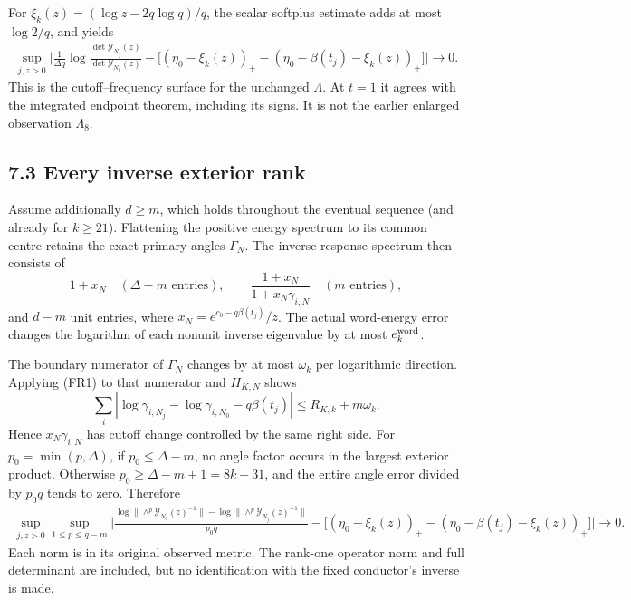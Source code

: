 \documentclass[10pt]{article}
\begin{document}
For \(\xi_k(z)=(\log z-2q\log q)/q\), the scalar softplus estimate adds at most \(\log2/q\), and yields \[
 \boxed{\begin{split}
 \sup_{j,z>0}\bigg|
 \frac1{\Delta q}\log\frac{\det\mathscr Y_{N_j}(z)}
 {\det\mathscr Y_{N_0}(z)}
 -\big[(\eta_0-\xi_k(z))_+
 -(\eta_0-\beta(t_j)-\xi_k(z))_+\big]
 \bigg|\longrightarrow0.
 \end{split}}
 \tag{FR5}
\] This is the cutoff--frequency surface for the unchanged \(\Lambda\). At \(t=1\) it agrees with the integrated endpoint theorem, including its signs. It is not the earlier enlarged observation \(\Lambda_8\).

\subsection{7.3 Every inverse exterior rank}\label{every-inverse-exterior-rank}

Assume additionally \(d\ge m\), which holds throughout the eventual sequence (and already for \(k\ge21\)). Flattening the positive energy spectrum to its common centre retains the exact primary angles \(\Gamma_N\). The inverse-response spectrum then consists of \[
 1+x_N\quad(\Delta-m\text{ entries}),\qquad
 \frac{1+x_N}{1+x_N\gamma_{i,N}}\quad(m\text{ entries}),
\] and \(d-m\) unit entries, where \(x_N=e^{c_0-q\beta(t_j)}/z\). The actual word-energy error changes the logarithm of each nonunit inverse eigenvalue by at most \(e_k^{\rm word}\).

The boundary numerator of \(\Gamma_N\) changes by at most \(\omega_k\) per logarithmic direction. Applying (FR1) to that numerator and \(H_{K,N}\) shows \[
 \sum_i|\log\gamma_{i,N_j}-\log\gamma_{i,N_0}
             -q\beta(t_j)|\le R_{K,k}+m\omega_k.
\] Hence \(x_N\gamma_{i,N}\) has cutoff change controlled by the same right side. For \(p_0=\min(p,\Delta)\), if \(p_0\le\Delta-m\), no angle factor occurs in the largest exterior product. Otherwise \(p_0\ge\Delta-m+1=8k-31\), and the entire angle error divided by \(p_0q\) tends to zero. Therefore \[
 \boxed{\begin{split}
 \sup_{j,z>0}\sup_{1\le p\le q-m}\bigg|
 \frac{\log\|\wedge^p\mathscr Y_{N_0}(z)^{-1}\|
       -\log\|\wedge^p\mathscr Y_{N_j}(z)^{-1}\|}{p_0q}
 -\big[(\eta_0-\xi_k(z))_+
 -(\eta_0-\beta(t_j)-\xi_k(z))_+\big]
 \bigg|\to0.
 \end{split}}
 \tag{FR6}
\] Each norm is in its original observed metric. The rank-one operator norm and full determinant are included, but no identification with the fixed conductor's inverse is made.
\end{document}
